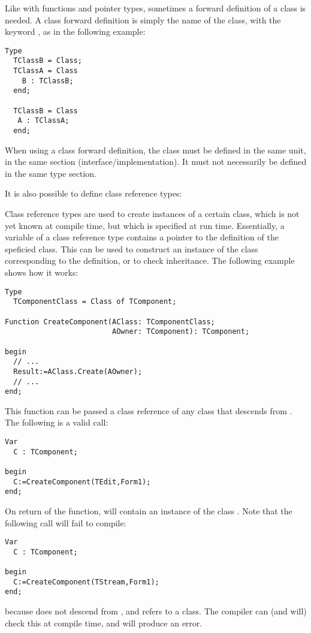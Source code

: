 \begin{remark}
Like with functions and pointer types, sometimes a forward definition of a
class is needed. A class forward definition is simply the name of the class,
with the keyword , as in the following example:
\begin{verbatim}
Type
  TClassB = Class;
  TClassA = Class
    B : TClassB;
  end;

  TClassB = Class
   A : TClassA;
  end;
\end{verbatim}
When using a class forward definition, the class must be defined in the same
unit, in the same section (interface/implementation). It must not
necessarily be defined in the same type section.
\end{remark}

It is also possible to define class reference types:

Class reference types are used to create instances of a certain class, which
is not yet known at compile time, but which is specified at run time. 
Essentially, a variable of a class reference type contains a pointer to the
definition of the speficied class. This can be used to construct an instance 
of the class corresponding to the definition, or to check inheritance. 
The following example shows how it works:
\begin{verbatim}
Type
  TComponentClass = Class of TComponent;

Function CreateComponent(AClass: TComponentClass; 
                         AOwner: TComponent): TComponent;

begin
  // ...
  Result:=AClass.Create(AOwner);
  // ...
end;
\end{verbatim}
This function can be passed a class reference of any class that descends
from . The following is a valid call:
\begin{verbatim}
Var
  C : TComponent;

begin
  C:=CreateComponent(TEdit,Form1);
end;
\end{verbatim}
On return of the  function,  will contain an 
instance of the class . Note that the following call will fail to
compile:
\begin{verbatim}
Var
  C : TComponent;

begin
  C:=CreateComponent(TStream,Form1);
end;
\end{verbatim}
because  does not descend from , and
 refers to a  class. The compiler can
(and will) check this at compile time, and will produce an error.


